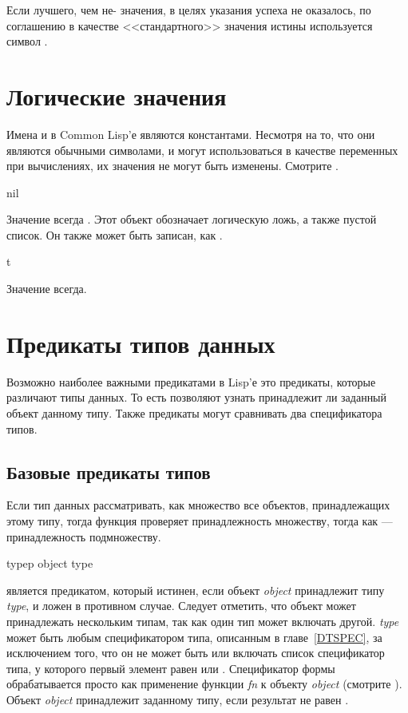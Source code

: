 Если лучшего, чем не-{\nil} значения, в целях указания успеха не оказалось, по
соглашению в качестве <<стандартного>> значения истины используется символ .

\section{Логические значения}

Имена  и  в Common Lisp'е являются константами. Несмотря на то,
что они являются обычными символами, и могут использоваться в качестве переменных
при вычислениях, их значения не могут быть изменены. Смотрите .

\begin{defun}[Константа]
nil

Значение {\nil} всегда {\nil}. Этот объект обозначает логическую ложь, а также
пустой список. Он также может быть записан, как \cd{()}.
\end{defun}

\begin{defun}[Константа]
t

Значение  всегда.
\end{defun}

\section{Предикаты типов данных}

Возможно наиболее важными предикатами в Lisp'е это предикаты, которые различают
типы данных. То есть позволяют узнать принадлежит ли заданный объект данному 
типу. Также предикаты могут сравнивать два спецификатора типов.

\subsection{Базовые предикаты типов}

Если тип данных рассматривать, как множество все объектов, принадлежащих этому
типу, тогда функция  проверяет принадлежность множеству, тогда как
 --- принадлежность подмножеству.

\begin{defun}[Функция]
typep object type

 является предикатом, который истинен, если объект \emph{object}
принадлежит типу \emph{type}, и ложен в противном случае.
Следует отметить, что объект может принадлежать нескольким типам, так как один
тип может включать другой. \emph{type} может быть любым спецификатором типа,
описанным в главе~\ref{DTSPEC}, за исключением того, что он не может быть или
включать список спецификатор типа, у которого первый элемент равен
 или .
Спецификатор формы  обрабатывается просто как применение
функции \emph{fn} к объекту \emph{object} (смотрите ). Объект
\emph{object} принадлежит заданному типу, если результат не равен {\false}.
\end{defun}

